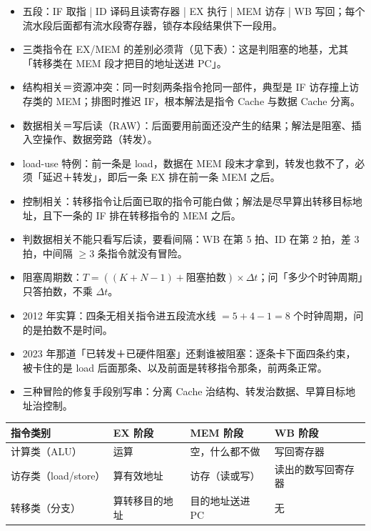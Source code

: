 \documentclass[10pt,a4paper]{ctexart}
\begin{document}
\begin{itemize}

\item 五段：IF 取指 | ID 译码且读寄存器 | EX 执行 | MEM 访存 | WB 写回；每个流水段后面都有流水段寄存器，锁存本段结果供下一段用。

\item 三类指令在 EX/MEM 的差别必须背（见下表）：这是判阻塞的地基，尤其「转移类在 MEM 段才把目的地址送进 PC」。

\item 结构相关＝资源冲突：同一时刻两条指令抢同一部件，典型是 IF 访存撞上访存类的 MEM；排图时推迟 IF，根本解法是指令 Cache 与数据 Cache 分离。

\item 数据相关＝写后读（RAW）：后面要用前面还没产生的结果；解法是阻塞、插入空操作、数据旁路（转发）。

\item load-use 特例：前一条是 load，数据在 MEM 段末才拿到，转发也救不了，必须「延迟＋转发」，即后一条 EX 排在前一条 MEM 之后。

\item 控制相关：转移指令让后面已取的指令可能白做；解法是尽早算出转移目标地址，且下一条的 IF 排在转移指令的 MEM 之后。

\item 判数据相关不能只看写后读，要看间隔：WB 在第 5 拍、ID 在第 2 拍，差 3 拍，中间隔 $\ge 3$ 条指令就没有冒险。

\item 阻塞周期数：$T=((K+N-1)+\text{阻塞拍数})\times\Delta t$；问「多少个时钟周期」只答拍数，不乘 $\Delta t$。

\item 2012 年实算：四条无相关指令进五段流水线 $=5+4-1=8$ 个时钟周期，问的是拍数不是时间。

\item 2023 年那道「已转发＋已硬件阻塞」还剩谁被阻塞：逐条卡下面四条约束，被卡住的是 load 后面那条、以及前面是转移指令那条，前两条正常。

\item 三种冒险的修复手段别写串：分离 Cache 治结构、转发治数据、早算目标地址治控制。

\end{itemize}

\begin{center}\small
\begin{tabularx}{\linewidth}{@{}>{\raggedright\arraybackslash}Xll>{\raggedright\arraybackslash}X@{}}
\toprule
指令类别 & EX 阶段 & MEM 阶段 & WB 阶段 \\
\midrule
计算类（ALU） & 运算 & 空，什么都不做 & 写回寄存器 \\
访存类（load/store） & 算有效地址 & 访存（读或写） & 读出的数写回寄存器 \\
转移类（分支） & 算转移目的地址 & 目的地址送进 PC & 无 \\
\bottomrule
\end{tabularx}
\end{center}
\end{document}
